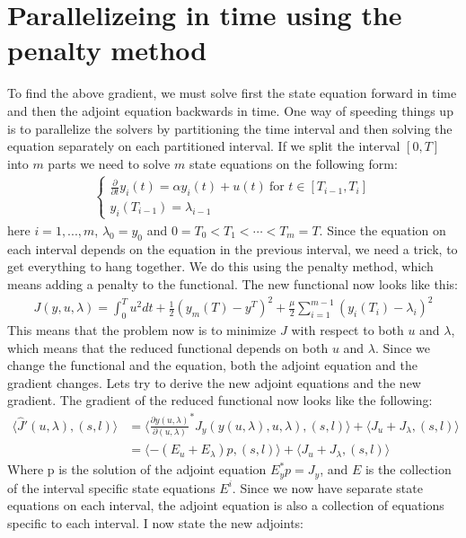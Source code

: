 \documentclass[11pt,a4paper]{article}
\begin{document}
\section*{Parallelizeing in time using the penalty method}
To find the above gradient, we must solve first the state equation forward in time and then the adjoint equation backwards in time. One way of speeding things up is to parallelize the solvers by partitioning the time interval and then solving the equation separately on each partitioned interval. If we split the interval $[0,T]$ into $m$ parts we need to solve $m$ state equations on the following form:
\begin{align*}
   \left\{
     \begin{array}{lr}
       \frac{\partial }{\partial t} y_i(t) = \alpha y_i(t) + u(t) \ \text{for $t \in [T_{i-1},T_{i}]$}\\
	y_i(T_{i-1}) = \lambda_{i-1}
     \end{array}
   \right.
\end{align*}
here $i=1,...,m$, $\lambda_0=y_0$ and $0=T_0<T_1<\cdots<T_{m}=T$. Since the equation on each interval depends on the equation in the previous interval, we need a trick, to get everything to hang together. We do this using the penalty method, which means adding a penalty to the functional. The new functional now looks like this:
\begin{align}
J(y,u,\lambda) = \int_0^T u^2 dt + \frac{1}{2}(y_m(T)-y^T)^2 + \frac{\mu}{2} \sum_{i=1}^{m-1} (y_{i}(T_i)-\lambda_i)^2 \label{penalty_func}
\end{align}
This means that the problem now is to minimize $J$ with respect to both $u$ and $\lambda$, which means that the reduced functional depends on both $u$ and $\lambda$. Since we change the functional and the equation, both the adjoint equation and the gradient changes. Lets try to derive the new adjoint equations and the new gradient. The gradient of the reduced functional now looks like the following:
\begin{align}
\langle \hat{J}'(u,\lambda), (s,l)\rangle &= \langle \frac{\partial y(u,\lambda)}{\partial(u,\lambda)}^* J_y(y(u,\lambda),u,\lambda), (s,l)\rangle + \langle J_u+J_{\lambda}, (s,l)\rangle \\
&=\langle -(E_u+E_{\lambda})p , (s,l)\rangle + \langle J_u+J_{\lambda}, (s,l)\rangle \label{pen_abs_grad}
\end{align} 
Where p is the solution of the adjoint equation $E_y^*p=J_y$, and $E$ is the collection of the interval specific state equations $E^i$. Since we now have separate state equations on each interval, the adjoint equation is also a collection of equations specific to each interval. I now state the new adjoints:
\end{document}
